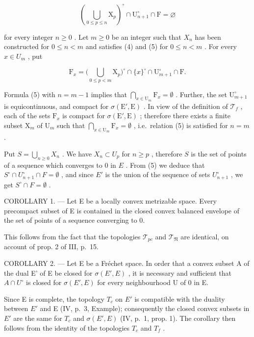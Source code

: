 \[
\left(\bigcup_ {0 \leqslant p \leqslant n} \mathrm{X} _ {p}\right) ^ {\circ} \cap \mathrm{U} _ {n + 1} ^ {\circ} \cap \mathrm{F} = \varnothing\tag{5}
\]

for every integer \(n \geqslant 0\) . Let \(m \geqslant 0\) be an integer such that \(X_{n}\) has been constructed for \(0 \leqslant n < m\) and satisfies (4) and (5) for \(0 \leqslant n < m\) . For every \(x \in U_{m}\) , put

\[
\mathrm{F} _ {x} = \big (\bigcup_ {0 \leqslant p <   m} \mathrm{X} _ {p} \big) ^ {\circ} \cap \{x \} ^ {\circ} \cap \mathrm{U} _ {m + 1} ^ {\circ} \cap \mathrm{F}.
\]

Formula (5) with \(n = m - 1\) implies that \(\bigcap_{x\in \mathrm{U}_m}\mathrm{F}_x = \emptyset\) . Further, the set \(\mathrm{U}_{m + 1}^{\circ}\) is equicontinuous, and compact for \(\sigma (\mathrm{E}',\mathrm{E})\) . In view of the definition of \(\mathcal{T}_f\) , each of the sets \(\mathrm{F}_x\) is compact for \(\sigma (\mathrm{E}',\mathrm{E})\) ; therefore there exists a finite subset \(\mathrm{X}_m\) of \(\mathrm{U}_m\) such that \(\bigcap_{x\in \mathrm{U}_m}\mathrm{F}_x = \emptyset\) , i.e.~relation (5) is satisfied for \(n = m\) .

Put \(S = \bigcup_{n\geqslant 0}X_n\) . We have \(X_{n}\subset U_{p}\) for \(n\geqslant p\) , therefore \(S\) is the set of points of a sequence which converges to 0 in \(E\) . From (5) we deduce that \(S^{\circ}\cap U_{n + 1}^{\circ}\cap F = \emptyset\) , and since \(E'\) is the union of the sequence of sets \(U_{n + 1}^{\circ}\) , we get \(S^{\circ}\cap F = \emptyset\) .

COROLLARY 1. --- Let E be a locally convex metrizable space. Every precompact subset of E is contained in the closed convex balanced envelope of the set of points of a sequence converging to 0.

This follows from the fact that the topologies \(\mathcal{T}_{pc}\) and \(\mathcal{T}_{\mathfrak{N}}\) are identical, on account of prop. 2 of III, p.~15.

COROLLARY 2. --- Let E be a Fréchet space. In order that a convex subset A of the dual E' of E be closed for \(\sigma(E', E)\) , it is necessary and sufficient that \(A \cap U^{\circ}\) is closed for \(\sigma(E', E)\) for every neighbourhood U of 0 in E.

Since E is complete, the topology \(T_{c}\) on \(E'\) is compatible with the duality between \(E'\) and E (IV, p.~3, Example); consequently the closed convex subsets in \(E'\) are the same for \(T_{c}\) and \(\sigma(E', E)\) (IV, p.~1, prop. 1). The corollary then follows from the identity of the topologies \(T_{c}\) and \(T_{f}\) .


